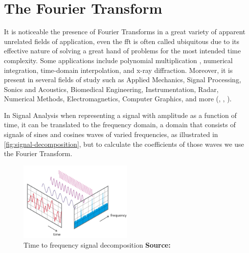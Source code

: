 \documentclass[
  oneside,
  11pt, a4paper,
  footinclude=true,
  headinclude=true,
  cleardoublepage=empty
]{scrbook}
\newcommand*{\source}[1]{%
    \textbf{Source:} \cite{#1}%
}
\begin{document}



\chapter{The Fourier Transform} \label{chap:the-fourier-transform}

It is noticeable the presence of Fourier Transforms in a great variety of apparent unrelated fields of application, even the \acrshort{fft} is often called ubiquitous due to its effective nature of solving a great hand of problems for the most intended time complexity. Some applications include polynomial multiplication \cite{jia2014polynomial}, numerical integration, time-domain interpolation, and x-ray diffraction. Moreover, it is present in several fields of study such as Applied Mechanics, Signal Processing, Sonics and Acoustics, Biomedical Engineering, Instrumentation, Radar, Numerical Methods, Electromagnetics, Computer Graphics, and more (\cite{shakshi2016brain}, \cite{lee2017design}, \cite{brigham1988fast}).

In Signal Analysis when representing a signal with amplitude as a function of time, it can be translated to the frequency domain, a domain that consists of signals of sines and cosines waves of varied frequencies, as illustrated in \autoref{fig:signal-decomposition}, but to calculate the coefficients of those waves we use the Fourier Transform.

\begin{figure}[h] 
    \centering
    \includegraphics[width=0.5\textwidth]{img/fft_time_freq.png}
    \caption{Time to frequency signal decomposition \source{fftntiaudio}}
    \label{fig:signal-decomposition}
\end{figure}
\end{document}

